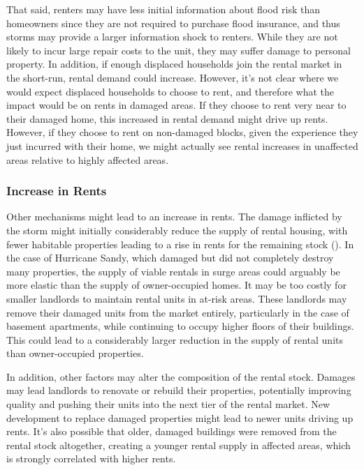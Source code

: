 \documentclass[12pt]{article}
\begin{document}
{{{That said, renters may have less initial information about flood risk than homeowners since they are not required to purchase flood insurance, and thus storms may provide a larger information shock to renters.  While they are not likely to incur large repair costs to the unit, they may suffer damage to personal property.  In addition, if enough displaced households join the rental market in the short-run, rental demand could increase. However, it's not clear where we would expect displaced households to choose to rent, and therefore what the impact would be on rents in damaged areas.  If they choose to rent very near to their damaged home, this increased in rental demand might drive up rents.  However, if they choose to rent on non-damaged blocks, given the experience they just incurred with their home, we might actually see rental increases in unaffected areas relative to highly affected areas. 

\subsubsection*{Increase in Rents}
Other mechanisms might lead to an increase in rents. The damage inflicted by the storm might initially considerably reduce the supply of rental housing, with fewer habitable properties leading to a rise in rents for the remaining stock (\cite{vigdor_economic_2008}).  In the case of Hurricane Sandy, which damaged but did not completely destroy many properties, the supply of viable rentals in surge areas could arguably be more elastic than the supply of owner-occupied homes.  It may be too costly for smaller landlords to maintain rental units in at-risk areas.  These landlords may remove their damaged units from the market entirely, particularly in the case of basement apartments, while continuing to occupy higher floors of their buildings. This could lead to a considerably larger reduction in the supply of rental units than owner-occupied properties. 

In addition, other factors may alter the composition of the rental stock.  Damages may lead landlords to renovate or rebuild their properties, potentially improving quality and pushing their units into the next tier of the rental market. New development to replace damaged properties might lead to newer units driving up rents. It's also possible that older, damaged buildings were removed from the rental stock altogether, creating a younger rental supply in affected areas, which is strongly correlated with higher rents.

}}}
\end{document}

